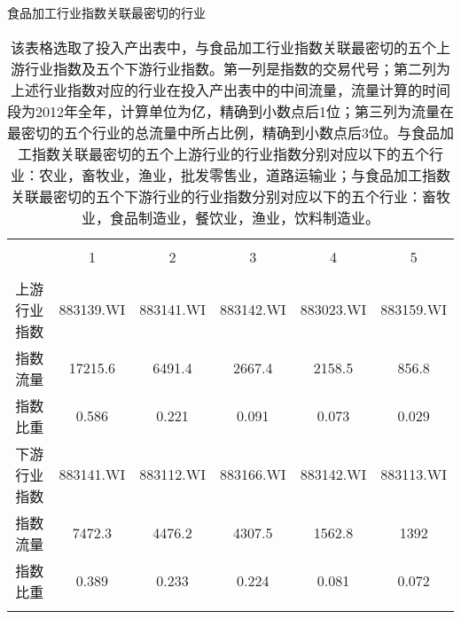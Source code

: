 \documentclass{sysuthesis}
\begin{document}
\begin{table}[!htbp] \centering 
  \caption{食品加工行业指数关联最密切的行业} 
  \caption*{\footnotesize 该表格选取了投入产出表中，与食品加工行业指数关联最密切的五个上游行业指数及五个下游行业指数。第一列是指数的交易代号；第二列为上述行业指数对应的行业在投入产出表中的中间流量，流量计算的时间段为2012年全年，计算单位为亿，精确到小数点后1位；第三列为流量在最密切的五个行业的总流量中所占比例，精确到小数点后3位。与食品加工指数关联最密切的五个上游行业的行业指数分别对应以下的五个行业：农业，畜牧业，渔业，批发零售业，道路运输业；与食品加工指数关联最密切的五个下游行业的行业指数分别对应以下的五个行业：畜牧业，食品制造业，餐饮业，渔业，饮料制造业。}
  \label{siliao-table} 
  \begin{tabular}{@{\extracolsep{5pt}} cccccc} 
  \\[-1.8ex]\hline 
  \hline \\[-1.8ex] 
   & 1 & 2 & 3 & 4 & 5 \\ 
  \hline \\[-1.8ex] 
  上游行业指数 & 883139.WI & 883141.WI & 883142.WI & 883023.WI & 883159.WI \\ 
  指数流量 & 17215.6 & 6491.4 & 2667.4 & 2158.5 & 856.8 \\ 
  指数比重 & 0.586 & 0.221 & 0.091 & 0.073 & 0.029 \\ 
  下游行业指数 & 883141.WI & 883112.WI & 883166.WI & 883142.WI & 883113.WI \\ 
  指数流量 & 7472.3 & 4476.2 & 4307.5 & 1562.8 & 1392 \\ 
  指数比重 & 0.389 & 0.233 & 0.224 & 0.081 & 0.072 \\ 
  \hline \\[-1.8ex] 
  \end{tabular} 
\end{table} 
\end{document}
